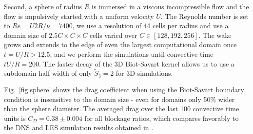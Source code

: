 \documentclass[lineno]{JFM-FLM_Au}
\begin{document}
Second, a sphere of radius $R$ is immersed in a viscous incompressible flow and the flow is impulsively started with a uniform velocity $U$. The Reynolds number is set to $Re=U2R/\nu=7400$, we use a resolution of 44 cells per radius and use a domain size of $2.5C \times C \times C$ cells varied over $C\in[128,192,256]$. The wake grows and extends to the edge of even the largest computational domain once $t=U/R>12.5$, and we perform the simulations until convective time $tU/R=200$. The faster decay of the 3D Biot-Savart kernel allows us to use a subdomain half-width of only $\tilde S_3=2$ for 3D simulations. 

Fig.~\ref{fig:sphere} shows the drag coefficient when using the Biot-Savart boundary condition is insensitive to the domain size - even for domains only 50\% wider than the sphere diameter. The averaged drag over the last 100 convective time units is $C_D=0.38 \pm 0.004$ for all blockage ratios, which compares favorably to the DNS and LES simulation results obtained in \citep{Yun2006VorticalNumbers, Rodriguez2011Direct3700}. 
\end{document}
